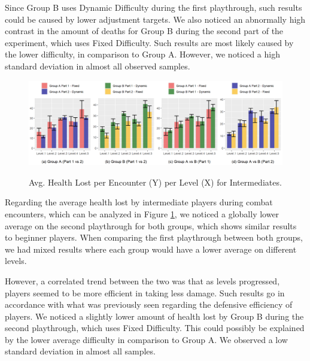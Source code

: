 Since Group B uses Dynamic Difficulty during the first playthrough, such results could be caused by lower adjustment targets. We also noticed an abnormally high contrast in the amount of deaths for Group B during the second part of the experiment, which uses Fixed Difficulty. Such results are most likely caused by the lower difficulty, in comparison to Group A. However, we noticed a high standard deviation in almost all observed samples.

\begin{figure}[!ht]
    \begin{center}
    \caption{Avg. Health Lost per Encounter (Y) per Level (X) for Intermediates.}
        \includegraphics[width=\textwidth]{figures/health_lost_per_encounter-intermediate_players.png}
        \label{fig:result-metric-intermediates-health-lost-per-encounter}
    \end{center}
\end{figure}

Regarding the average health lost by intermediate players during combat encounters, which can be analyzed in Figure \ref{fig:result-metric-intermediates-health-lost-per-encounter}, we noticed a globally lower average on the second playthrough for both groups, which shows similar results to beginner players. When comparing the first playthrough between both groups, we had mixed results where each group would have a lower average on different levels.

However, a correlated trend between the two was that as levels progressed, players seemed to be more efficient in taking less damage. Such results go in accordance with what was previously seen regarding the defensive efficiency of players. We noticed a slightly lower amount of health lost by Group B during the second playthrough, which uses Fixed Difficulty. This could possibly be explained by the lower average difficulty in comparison to Group A. We observed a low standard deviation in almost all samples.

